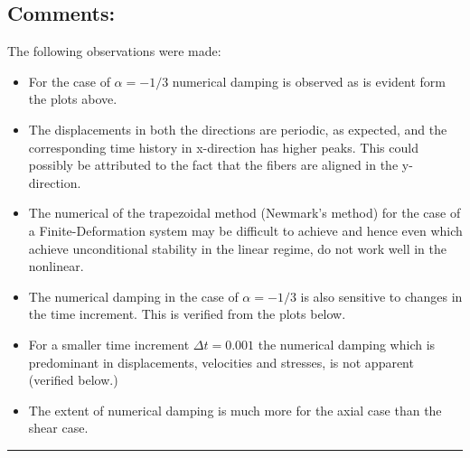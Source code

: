 \subsection*{Comments: }
The following observations were made: 
\begin{itemize}
\item For the case of $\alpha = -1/3$ numerical damping is observed as is evident form the plots above.
\item The displacements in both the directions are periodic, as expected, and the corresponding time history in x-direction has higher peaks. This could possibly be attributed to the fact that the fibers are aligned in the y-direction.  
\item The numerical of the trapezoidal method (Newmark's method) for the case of a Finite-Deformation system may be difficult to achieve and hence even which achieve unconditional stability in the linear regime, do not work well in the nonlinear. 
\item The numerical damping in the case of $\alpha = -1/3$ is also sensitive to changes in the time increment. This is verified from the plots below. 
\item For a smaller time increment $\Delta t = 0.001$ the numerical damping which is predominant in displacements, velocities and stresses, is not apparent (verified below.)
\item The extent of numerical damping is much more for the axial case than the shear case.  \\
\end{itemize}\hrule
